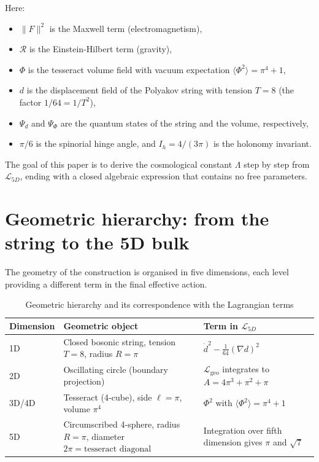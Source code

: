 \documentclass[12pt]{article}
\begin{document}
Here:
\begin{itemize}
  \item \(\|F\|^2\) is the Maxwell term (electromagnetism),
  \item \(\mathcal{R}\) is the Einstein-Hilbert term (gravity),
  \item \(\Phi\) is the tesseract volume field with vacuum expectation \(\langle\Phi^2\rangle = \pi^4+1\),
  \item \(d\) is the displacement field of the Polyakov string with tension \(T=8\) (the factor \(1/64 = 1/T^2\)),
  \item \(\Psi_d\) and \(\Psi_\Phi\) are the quantum states of the string and the volume, respectively,
  \item \(\pi/6\) is the spinorial hinge angle, and \(I_h = 4/(3\pi)\) is the holonomy invariant.
\end{itemize}

The goal of this paper is to derive the cosmological constant \(\Lambda\) step by step from \(\mathcal{L}_{5D}\), ending with a closed algebraic expression that contains no free parameters.

\section{Geometric hierarchy: from the string to the 5D bulk}

The geometry of the construction is organised in five dimensions, each level providing a different term in the final effective action.

\begin{table}[h]
\centering
\small
\setlength{\tabcolsep}{4pt}
\caption{Geometric hierarchy and its correspondence with the Lagrangian terms}
\label{tab:geometry}
\begin{tabular}{p{} p{} p{}}
\toprule
\textbf{Dimension} & \textbf{Geometric object} & \textbf{Term in \(\mathcal{L}_{5D}\)} \\
\midrule
1D & Closed bosonic string, tension \(T=8\), radius \(R=\pi\) & \(\dot{d}^2 - \frac{1}{64}(\nabla d)^2\) \\
2D & Oscillating circle (boundary projection) & \(\mathcal{L}_{\text{geo}}\) integrates to \(A = 4\pi^3+\pi^2+\pi\) \\
3D/4D & Tesseract (4‑cube), side \(\ell=\pi\), volume \(\pi^4\) & \(\Phi^2\) with \(\langle\Phi^2\rangle = \pi^4+1\) \\
5D & Circumscribed 4‑sphere, radius \(R=\pi\), diameter \(2\pi = \text{tesseract diagonal}\) & Integration over fifth dimension gives \(\pi\) and \(\sqrt{7}\) \\
\hline
\end{tabular}
\end{table}
\end{document}
